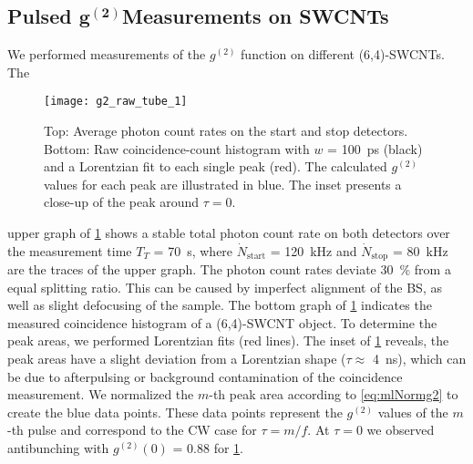 \subsection{Pulsed \texorpdfstring{$\boldsymbol{g^{(2)}}$}{g2}Measurements on SWCNTs} \label{sec:g2_exp_lifetimes}
We performed measurements of the $g^{(2)}$ function on different (6,4)-\acp{SWCNT}. The 
\begin{figure}[htp]
	\centering
	\texttt{[image: g2\_raw\_tube\_1]}
	\caption{Top: Average photon count rates on the start and stop detectors. Bottom: Raw coincidence-count histogram with $w$ = \SI{100}{\ps} (black) and a Lorentzian fit to each single peak (red). The calculated $g^{(2)}$ values for each peak are illustrated in blue. The inset presents a close-up of the peak around $\tau=0$.}
	\label{fig:g2_tube_max_1}
\end{figure}
\noindent upper graph of \cref{fig:g2_tube_max_1} shows a stable total photon count rate on both detectors over the measurement time $T_T$ = \SI{70}{\s}, where $\dot{N}_\mathrm{start}$ = \SI{120}{\kHz} and $\dot{N}_\mathrm{stop}$ = \SI{80}{\kHz} are the traces of the upper graph. The photon count rates deviate \SI{30}{\percent} from a equal splitting ratio. This can be caused by imperfect alignment of the \ac{BS}, as well as slight defocusing of the sample. The bottom graph of \cref{fig:g2_tube_max_1} indicates the measured coincidence histogram of a (6,4)-\ac{SWCNT} object. 
To determine the peak areas, we performed Lorentzian fits (red lines). The inset of \cref{fig:g2_tube_max_1} reveals, the peak areas have a slight deviation from a Lorentzian shape ($\tau \approx$ \SI{4}{\ns}), which can be due to afterpulsing or background contamination of the coincidence measurement. We normalized the $m$-th peak area according to \cref{eq:mlNormg2} to create the blue data points. These data points represent the $g^{(2)}$ values of the $m$-th pulse and correspond to the \ac{CW} case for $\tau=m/f$. At $\tau=0$ we observed antibunching with $g^{(2)}(0)$ = \num{0.88} for \cref{fig:g2_tube_max_1}.\\

